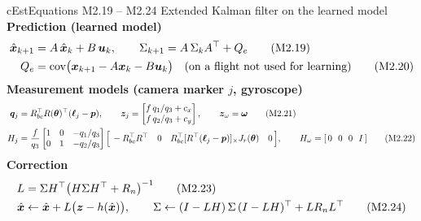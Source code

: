 \begin{eqbox}{cEst}{Equations M2.19 -- M2.24 \quad Extended Kalman filter on the learned model}
\textbf{Prediction (learned model)}
\begin{align}
  \hat{\bm x}_{k+1}&=A\,\hat{\bm x}_k+B\,\bm{u}_k,\qquad \Sigma_{k+1}=A\,\Sigma_k A^\top+Q_e \tag{M2.19}\label{eq:m2.19}\\
  Q_e&=\mathrm{cov}\big(\bm{x}_{k+1}-A\bm{x}_k-B\bm{u}_k\big)\quad\text{(on a flight not used for learning)} \tag{M2.20}\label{eq:m2.20}
\end{align}
\textbf{Measurement models (camera marker $j$, gyroscope)}
\begin{align}
  \bm q_j&=R_{bc}^\top R(\vth)^\top(\bm\ell_j-\vp),\qquad
  \vz_j=\begin{bmatrix}f\,q_1/q_3+c_x\\ f\,q_2/q_3+c_y\end{bmatrix},\qquad \vz_\omega=\vw \tag{M2.21}\label{eq:m2.21}\\
  H_j&=\frac{f}{q_3}\begin{bmatrix}1&0&-q_1/q_3\\0&1&-q_2/q_3\end{bmatrix}
  \Big[\,-R_{bc}^\top R^\top\ \ \ 0\ \ \ R_{bc}^\top\skw{R^\top(\bm\ell_j-\vp)}J_r(\vth)\ \ \ 0\,\Big],\qquad H_\omega=[\,0\ \ 0\ \ 0\ \ I\,] \tag{M2.22}\label{eq:m2.22}
\end{align}
\textbf{Correction}
\begin{align}
  L&=\Sigma H^\top\big(H\Sigma H^\top+R_n\big)^{-1} \tag{M2.23}\label{eq:m2.23}\\
  \hat{\bm x}&\leftarrow\hat{\bm x}+L\big(\bm{z}-h(\hat{\bm x})\big),\qquad
  \Sigma\leftarrow(I-LH)\,\Sigma\,(I-LH)^\top+LR_nL^\top \tag{M2.24}\label{eq:m2.24}
\end{align}
\end{eqbox}

